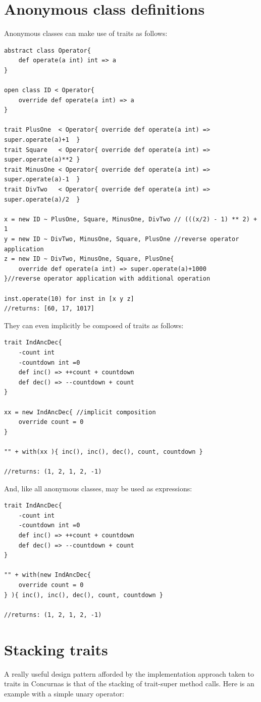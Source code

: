 \documentclass[conc-doc]{subfiles}
\begin{document}
\section{Anonymous class definitions}
Anonymous classes can make use of traits as follows:
\begin{lstlisting}
abstract class Operator{
	def operate(a int) int => a
}

open class ID < Operator{
	override def operate(a int) => a
}

trait PlusOne  < Operator{ override def operate(a int) => super.operate(a)+1  }
trait Square   < Operator{ override def operate(a int) => super.operate(a)**2 }
trait MinusOne < Operator{ override def operate(a int) => super.operate(a)-1  }
trait DivTwo   < Operator{ override def operate(a int) => super.operate(a)/2  }

x = new ID ~ PlusOne, Square, MinusOne, DivTwo // (((x/2) - 1) ** 2) + 1
y = new ID ~ DivTwo, MinusOne, Square, PlusOne //reverse operator application
z = new ID ~ DivTwo, MinusOne, Square, PlusOne{
	override def operate(a int) => super.operate(a)+1000
}//reverse operator application with additional operation

inst.operate(10) for inst in [x y z]
//returns: [60, 17, 1017]
\end{lstlisting}

They can even implicitly be composed of traits as follows:
\begin{lstlisting}
trait IndAncDec{
	-count int
	-countdown int =0
	def inc() => ++count + countdown
	def dec() => --countdown + count
}

xx = new IndAncDec{ //implicit composition
	override count = 0
}

"" + with(xx ){ inc(), inc(), dec(), count, countdown }

//returns: (1, 2, 1, 2, -1)
\end{lstlisting}

And, like all anonymous classes, may be used as expressions:
\begin{lstlisting}
trait IndAncDec{
	-count int
	-countdown int =0
	def inc() => ++count + countdown
	def dec() => --countdown + count
}

"" + with(new IndAncDec{ 
	override count = 0
} ){ inc(), inc(), dec(), count, countdown }

//returns: (1, 2, 1, 2, -1)
\end{lstlisting}

\section{Stacking traits}
A really useful design pattern afforded by the implementation approach taken to traits in Concurnas is that of the stacking of trait-super method calls. Here is an example with a simple unary operator:
\end{document}
